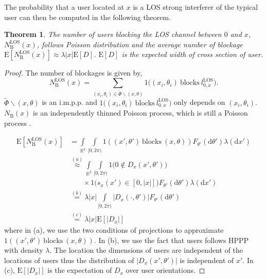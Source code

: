 \documentclass[10pt, conference, letterpaper]{IEEEtran}
\newtheorem{theorem}{Theorem}
\begin{document}
The probability that a user located at $x$ is a LOS strong interferer of the typical user can then be computed in the following theorem.

\begin{theorem}\label{theorem:E_N_B_LOS}
	The number of users blocking the LOS channel between $0$ and $x$, $N_\mathrm{B}^\mathrm{LOS}(x)$, follows Poisson distribution and the average number of blockage $\mathrm{E}[N_{\mathrm{B}}^\mathrm{LOS}(x)] \approx \lambda |x| \mathrm{E}[D]$. $\mathrm{E}[D]$ is the expected width of cross section of user.  
\end{theorem}
\begin{proof}
	The number of blockages is given by,
	\begin{equation*}
	N_{\mathrm{B}}^\mathrm{LOS}(x) = \sum_{(x_i, \theta_i)\in \tilde{\Phi}\backslash(x,\theta)}1\big((x_i, \theta_i) \mathrm{~blocks~} l_{0,x}^{\mathrm{LOS}}\big).
	\end{equation*}
	$\tilde{\Phi}\backslash(x,\theta)$ is an i.m.p.p. and $1\big((x_i, \theta_i) \mathrm{~blocks~} l_{0,x}^{\mathrm{LOS}}\big)$ only depends on $(x_i, \theta_i)$. $N_{\mathrm{B}}(x)$ is an independently thinned Poisson process, which is still a Poisson process \cite{stochasticgeometry}. 
	
	\begin{align}
	\mathrm{E}[N_{\mathrm{B}}^\mathrm{LOS}(x)] & =  \int\limits_{\mathbb{R}^2}\int\limits_{[0,2\pi)}\mathrm{1}((x',\theta')\mathrm{~blocks~}(x,\theta))F_{\theta'}(\mathrm{d}\theta')\lambda(\mathrm{d}x') \nonumber\\
	& \stackrel{(a)}{\approx} \int\limits_{\mathbb{R}^2}\int\limits_{[0,2\pi)}\mathrm{1}\big(0\notin D_x(x',\theta')\big) \nonumber\\
	& \phantom{{}=1} \times \mathrm{1}\big(s_{x}(x')\in[0,|x|]\big) F_{\theta'}(\mathrm{d}\theta')\lambda(\mathrm{d}x') \label{eq:2dblocking} \\
	& \stackrel{(b)} = \lambda|x|\int\limits_{[0,2\pi)}|D_x(\cdot, \theta')| F_{\theta'}(\mathrm{d}\theta') \nonumber\\
	& \stackrel{(c)} = \lambda|x|\mathrm{E}[|D_x|] \label{eq:N_blockage_original}
	\end{align}
	where in (a), we use the two conditions of projections to approximate $\mathrm{1}((x',\theta')\mathrm{~blocks~}(x,\theta))$. In (b), we use the fact that users follows HPPP with density $\lambda$. The location the dimensions of users are independent of the locations of users thus the distribution of $|D_x(x', \theta')|$ is independent of $x'$. In (c), $\mathrm{E}[|D_x|]$ is the expectation of $D_x$ over user orientations.
\end{proof}
\end{document}

